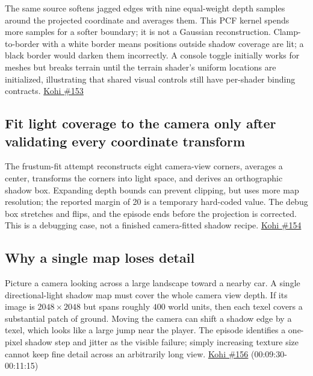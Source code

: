 The same source softens jagged edges with nine equal-weight depth samples around the projected coordinate and averages them. This PCF kernel spends more samples for a softer boundary; it is not a Gaussian reconstruction. Clamp-to-border with a white border means positions outside shadow coverage are lit; a black border would darken them incorrectly. A console toggle initially works for meshes but breaks terrain until the terrain shader's uniform locations are initialized, illustrating that shared visual controls still have per-shader binding contracts. \href{https://www.youtube.com/watch?v=32RYiLA3OBs}{Kohi \#153}

\subsection{Fit light coverage to the camera only after validating every coordinate transform}\label{06-engine-ii-ch026-fit-light-coverage-to-the-camera-only-after-validating-every-coordinate-transform}

\hypertarget{06-engine-ii-ch026-fit-light-coverage-to-the-camera-only-after-validating-every-coordinate-transform}{}

The frustum-fit attempt reconstructs eight camera-view corners, averages a center, transforms the corners into light space, and derives an orthographic shadow box. Expanding depth bounds can prevent clipping, but uses more map resolution; the reported margin of 20 is a temporary hard-coded value. The debug box stretches and flips, and the episode ends before the projection is corrected. This is a debugging case, not a finished camera-fitted shadow recipe. \href{https://www.youtube.com/watch?v=GfpDnw66Ue8}{Kohi \#154}

\subsection{Why a single map loses detail}\label{06-engine-ii-ch026-why-a-single-map-loses-detail}

\hypertarget{06-engine-ii-ch026-why-a-single-map-loses-detail}{}

Picture a camera looking across a large landscape toward a nearby car. A single directional-light shadow map must cover the whole camera view depth. If its image is \(2048\times2048\) but spans roughly \(400\) world units, then each texel covers a substantial patch of ground. Moving the camera can shift a shadow edge by a texel, which looks like a large jump near the player. The episode identifies a one-pixel shadow step and jitter as the visible failure; simply increasing texture size cannot keep fine detail across an arbitrarily long view. \href{https://www.youtube.com/watch?v=coWS_saBPBk}{Kohi \#156} (00:09:30-00:11:15)

